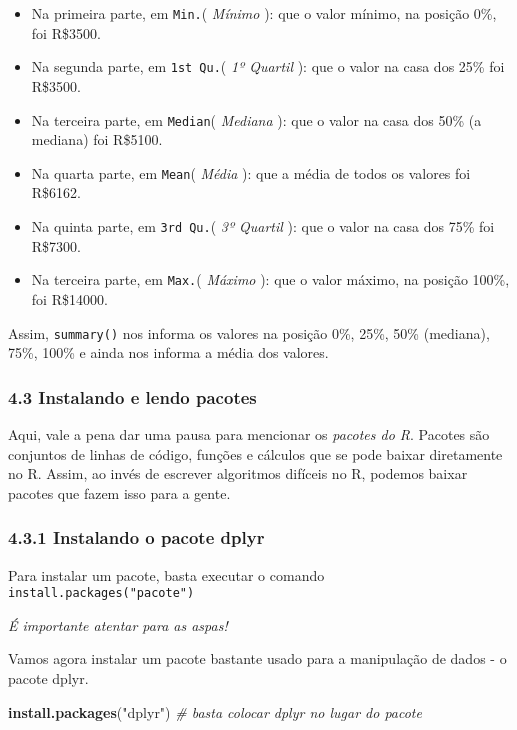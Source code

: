 \documentclass[
]{article}
\newenvironment{Shaded}{\begin{snugshade}}{\end{snugshade}}
\newcommand{\CommentTok}[1]{\textcolor[rgb]{0.56,0.35,0.01}{\textit{#1}}}
\newcommand{\KeywordTok}[1]{\textcolor[rgb]{0.13,0.29,0.53}{\textbf{#1}}}
\newcommand{\NormalTok}[1]{#1}
\newcommand{\StringTok}[1]{\textcolor[rgb]{0.31,0.60,0.02}{#1}}
\begin{document}
\begin{itemize}
\item
  Na primeira parte, em \texttt{Min.}( \emph{Mínimo} ): que o valor
  mínimo, na posição 0\%, foi R\$3500.
\item
  Na segunda parte, em \texttt{1st\ Qu.}( \emph{1º Quartil} ): que o
  valor na casa dos 25\% foi R\$3500.
\item
  Na terceira parte, em \texttt{Median}( \emph{Mediana} ): que o valor
  na casa dos 50\% (a mediana) foi R\$5100.
\item
  Na quarta parte, em \texttt{Mean}( \emph{Média} ): que a média de
  todos os valores foi R\$6162.
\item
  Na quinta parte, em \texttt{3rd\ Qu.}( \emph{3º Quartil} ): que o
  valor na casa dos 75\% foi R\$7300.
\item
  Na terceira parte, em \texttt{Max.}( \emph{Máximo} ): que o valor
  máximo, na posição 100\%, foi R\$14000.
\end{itemize}

Assim, \texttt{summary()} nos informa os valores na posição 0\%, 25\%,
50\% (mediana), 75\%, 100\% e ainda nos informa a média dos valores.

\hypertarget{instalando-e-lendo-pacotes}{%
\subsubsection{4.3 Instalando e lendo
pacotes}\label{instalando-e-lendo-pacotes}}

Aqui, vale a pena dar uma pausa para mencionar os \emph{pacotes do R}.
Pacotes são conjuntos de linhas de código, funções e cálculos que se
pode baixar diretamente no R. Assim, ao invés de escrever algoritmos
difíceis no R, podemos baixar pacotes que fazem isso para a gente.

\hypertarget{instalando-o-pacote-dplyr}{%
\subsubsection{4.3.1 Instalando o pacote
dplyr}\label{instalando-o-pacote-dplyr}}

Para instalar um pacote, basta executar o comando
\texttt{install.packages("pacote")}

\emph{É importante atentar para as aspas!}

Vamos agora instalar um pacote bastante usado para a manipulação de
dados - o pacote dplyr.

\begin{Shaded}
\begin{Highlighting}[]
\KeywordTok{install.packages}\NormalTok{(}\StringTok{"dplyr"}\NormalTok{) }\CommentTok{# basta colocar dplyr no lugar do pacote}
\end{Highlighting}
\end{Shaded}
\end{document}
